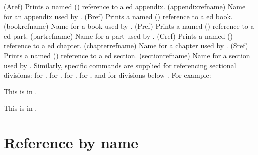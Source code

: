 \begin{syntax}
\cmd{\Aref} \cmd{\appendixrefname} \\
\cmd{\Bref} \cmd{\bookrefname} \\
\cmd{\Pref} \cmd{\partrefname} \\
\cmd{\Cref} \cmd{\chapterrefname} \\
\cmd{\Sref} \cmd{\sectionrefname} \\
\end{syntax}
\glossary(Aref)%
  {}%
  {Prints a named () reference to a ed appendix.}
\glossary(appendixrefname)%
  {}%
  {Name for an appendix used by .}
\glossary(Bref)%
  {}%
  {Prints a named () reference to a ed book.}
\glossary(bookrefname)%
  {}%
  {Name for a book used by .}
\glossary(Pref)%
  {}%
  {Prints a named () reference to a ed part.}
\glossary(partrefname)%
  {}%
  {Name for a part used by .}
\glossary(Cref)%
  {}%
  {Prints a named () reference to a ed chapter.}
\glossary(chapterrefname)%
  {}%
  {Name for a chapter used by .}
\glossary(Sref)%
  {}%
  {Prints a named () reference to a ed section.}
\glossary(sectionrefname)%
  {}%
  {Name for a section used by .}
Similarly, specific commands are supplied for referencing sectional 
divisions; \cmd{\Aref} for \appendixrefname,
\cmd{\Bref} for \bookrefname,
\cmd{\Pref} for \partrefname, 
\cmd{\Cref} for \chapterrefname,
and \cmd{\Sref} for divisions 
below \chapterrefname. For example:
\begin{lcode}
This is  in .
\end{lcode}
This is  in .


\section{Reference by name} \label{sec:nxref}


